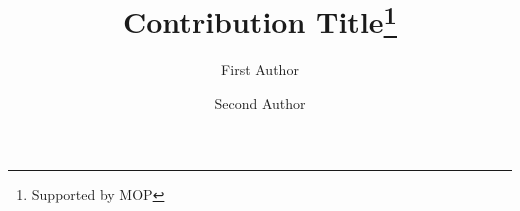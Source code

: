 \documentclass{article}
\begin{document}
%
\title{Contribution Title\thanks{Supported by MOP}}
%
%

\author{
  First Author
\and Second Author
}

%
%
\maketitle              %
\begin{abstract}
  

\end{abstract}

\setcounter{page}{0}
\thispagestyle{empty}
\newpage


% 

% 



%


%
%
% 



\end{document}
